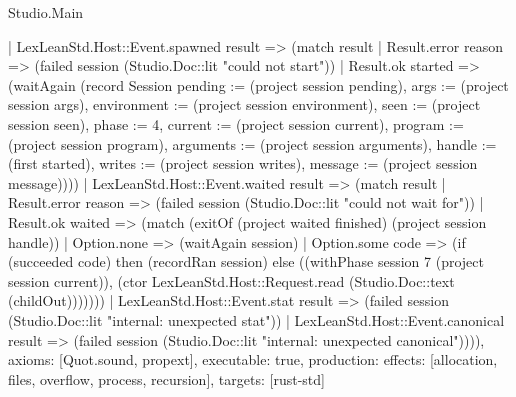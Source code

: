 \begin{lexlean}{Studio.Main}
\begin{semanticmodule}
{    | LexLeanStd.Host::Event.spawned result => (match result
      | Result.error reason => (failed session (Studio.Doc::lit "could not start"))
      | Result.ok started => (waitAgain (record Session {pending := (project session pending), args := (project session args), environment := (project session environment), seen := (project session seen), phase := 4, current := (project session current), program := (project session program), arguments := (project session arguments), handle := (first started), writes := (project session writes), message := (project session message)})))
    | LexLeanStd.Host::Event.waited result => (match result
      | Result.error reason => (failed session (Studio.Doc::lit "could not wait for"))
      | Result.ok waited => (match (exitOf (project waited finished) (project session handle))
        | Option.none => (waitAgain session)
        | Option.some code => (if (succeeded code) then (recordRan session) else ((withPhase session 7 (project session current)), (ctor LexLeanStd.Host::Request.read (Studio.Doc::text (childOut)))))))
    | LexLeanStd.Host::Event.stat result => (failed session (Studio.Doc::lit "internal: unexpected stat"))
    | LexLeanStd.Host::Event.canonical result => (failed session (Studio.Doc::lit "internal: unexpected canonical")))),
  axioms: [Quot.sound, propext],
  executable: true,
  production: {effects: [allocation, files, overflow, process, recursion], targets: [rust-std]}
}
\end{semanticmodule}
\end{lexlean}
